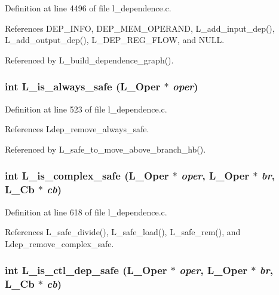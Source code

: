 Definition at line 4496 of file l\_\-dependence.c.

References DEP\_\-INFO, DEP\_\-MEM\_\-OPERAND, L\_\-add\_\-input\_\-dep(), L\_\-add\_\-output\_\-dep(), L\_\-DEP\_\-REG\_\-FLOW, and NULL.

Referenced by L\_\-build\_\-dependence\_\-graph().
\subsubsection{\setlength{\rightskip}{0pt plus 5cm}int L\_\-is\_\-always\_\-safe (L\_\-Oper $\ast$ {\em oper})}\label{l__dependence_8c_3edd827a868dd2511ca07c63805cf9ad}




Definition at line 523 of file l\_\-dependence.c.

References Ldep\_\-remove\_\-always\_\-safe.

Referenced by L\_\-safe\_\-to\_\-move\_\-above\_\-branch\_\-hb().
\subsubsection{\setlength{\rightskip}{0pt plus 5cm}int L\_\-is\_\-complex\_\-safe (L\_\-Oper $\ast$ {\em oper}, L\_\-Oper $\ast$ {\em br}, L\_\-Cb $\ast$ {\em cb})}\label{l__dependence_8c_26c981ff12249ed47a841e376b0f7d26}




Definition at line 618 of file l\_\-dependence.c.

References L\_\-safe\_\-divide(), L\_\-safe\_\-load(), L\_\-safe\_\-rem(), and Ldep\_\-remove\_\-complex\_\-safe.
\subsubsection{\setlength{\rightskip}{0pt plus 5cm}int L\_\-is\_\-ctl\_\-dep\_\-safe (L\_\-Oper $\ast$ {\em oper}, L\_\-Oper $\ast$ {\em br}, L\_\-Cb $\ast$ {\em cb})}\label{l__dependence_8c_80d98b26470385b84a121260baac6fd4}




